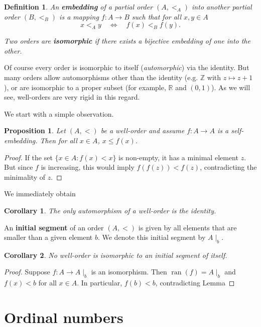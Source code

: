 \documentclass{article}
\newtheorem{corollary}{Corollary}[theorem]
\newtheorem{proposition}{Proposition}[section]
\newtheorem{definition}{Definition}[section]
\begin{document}
\begin{definition}An \textbf{embedding} of a partial order $(A,<_A)$ into another partial order $(B,<_B)$ is a mapping $f:A \to B$ such that for all $x,y \in A$
\begin{equation}

x <_A y \quad \iff \quad f(x) <_B f(y).
\end{equation}

Two orders are \textbf{isomorphic} if there exists a bijective embedding of one into the other.

\end{definition}Of course every order is isomorphic to itself (\textit{automorphic}) via the identity. But many orders allow automorphisms other than the identity (e.g. $\mathbb{Z}$ with $z \mapsto z+1$), or are isomorphic to a proper subset (for example, $\mathbb{R}$ and $(0,1)$). As we will see, well-orders are very rigid in this regard.

We start with a simple observation.

\begin{proposition}Let $(A,<)$ be a well-order and assume $f:A \to A$ is a self-embedding. Then for all $x \in A$, $x \leq f(x)$.

\end{proposition}\begin{proof}If the set $\{x \in A \colon f(x) < x\}$ is non-empty, it has a minimal element $z$. But since $f$ is increasing, this would imply $f(f(z)) < f(z)$, contradicting the minimality of $z$.

\end{proof}We immediately obtain

\begin{corollary}The only automorphism of a well-order is the identity.

\end{corollary}An \textbf{initial segment} of an order $(A,<)$ is given by all elements that are smaller than a given element $b$. We denote this initial segment by $A\mid_b$.

\begin{corollary}No well-order is isomorphic to an initial segment of itself.

\end{corollary}\begin{proof}Suppose $f: A \to A\mid_b$ is an isomorphism. Then $\operatorname{ran}(f) = A\mid_b$ and $f(x) < b$ for all $x \in A$. In particular, $f(b) < b$, contradicting Lemma

\end{proof}\section{Ordinal numbers}
\end{document}

